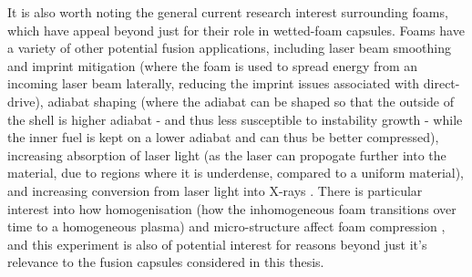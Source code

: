 It is also worth noting the general current research interest surrounding foams, which have appeal beyond just for their role in wetted-foam capsules. Foams have a variety of other potential fusion applications, including laser beam smoothing and imprint mitigation \cite{Depierreux2009, Hu2018} (where the foam is used to spread energy from an incoming laser beam laterally, reducing the imprint issues associated with direct-drive), adiabat shaping \cite{Craxton2015, Bodner1998, Collins2005} (where the adiabat can be shaped so that the outside of the shell is higher adiabat - and thus less susceptible to instability growth - while the inner fuel is kept on a lower adiabat and can thus be better compressed), increasing absorption of laser light \cite{Skupsky2004} (as the laser can propogate further into the material, due to regions where it is underdense, compared to a uniform material), and increasing conversion from laser light into X-rays \cite{Shang2016}. There is particular interest into how homogenisation (how the inhomogeneous foam transitions over time to a homogeneous plasma) and micro-structure affect foam compression \cite{Hazak1998, Cipriani2021, Cipriani2018a, Colvin2013}, and this experiment is also of potential interest for reasons beyond just it's relevance to the fusion capsules considered in this thesis.


